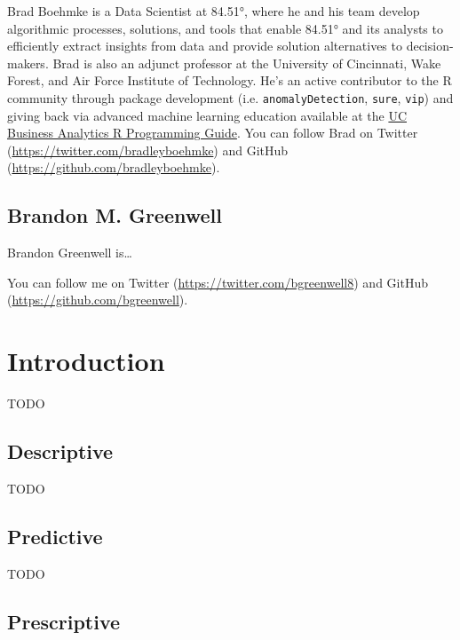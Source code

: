 \documentclass[]{book}
\theoremstyle{definition}
\theoremstyle{definition}
\theoremstyle{definition}
\theoremstyle{remark}
\begin{document}
Brad Boehmke is a Data Scientist at 84.51°, where he and his team
develop algorithmic processes, solutions, and tools that enable 84.51°
and its analysts to efficiently extract insights from data and provide
solution alternatives to decision-makers. Brad is also an adjunct
professor at the University of Cincinnati, Wake Forest, and Air Force
Institute of Technology. He's an active contributor to the R community
through package development (i.e. \texttt{anomalyDetection},
\texttt{sure}, \texttt{vip}) and giving back via advanced machine
learning education available at the \href{http://uc-r.github.io/}{UC
Business Analytics R Programming Guide}. You can follow Brad on Twitter
(\url{https://twitter.com/bradleyboehmke}) and GitHub
(\url{https://github.com/bradleyboehmke}).

\hypertarget{brandon-m.-greenwell}{%
\section*{Brandon M. Greenwell}\label{brandon-m.-greenwell}}

Brandon Greenwell is\ldots{}

You can follow me on Twitter (\url{https://twitter.com/bgreenwell8}) and
GitHub (\url{https://github.com/bgreenwell}).

\hypertarget{intro}{%
\chapter{Introduction}\label{intro}}

TODO

\hypertarget{descriptive}{%
\section{Descriptive}\label{descriptive}}

TODO

\hypertarget{predictive}{%
\section{Predictive}\label{predictive}}

TODO

\hypertarget{prescriptive}{%
\section{Prescriptive}\label{prescriptive}}
\end{document}
